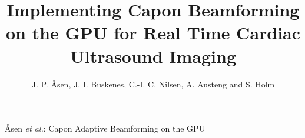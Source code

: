 \documentclass[12pt,journal,onecolumn]{IEEEtran}
\begin{document}
%
\title{Implementing Capon Beamforming on the GPU for Real Time Cardiac Ultrasound Imaging}
%
%
%

\author{J. P. \AA{}sen, J. I. Buskenes, C.-I. C. Nilsen, A. Austeng and S. Holm%
}

% 
%



%
{\AA{}sen \MakeLowercase{\textit{et al.}}: Capon Adaptive Beamforming on the GPU}
% 
\end{document}

